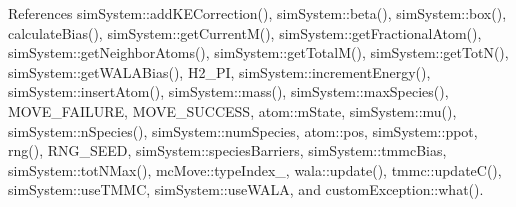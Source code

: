References sim\-System\-::add\-K\-E\-Correction(), sim\-System\-::beta(), sim\-System\-::box(), calculate\-Bias(), sim\-System\-::get\-Current\-M(), sim\-System\-::get\-Fractional\-Atom(), sim\-System\-::get\-Neighbor\-Atoms(), sim\-System\-::get\-Total\-M(), sim\-System\-::get\-Tot\-N(), sim\-System\-::get\-W\-A\-L\-A\-Bias(), H2\-\_\-P\-I, sim\-System\-::increment\-Energy(), sim\-System\-::insert\-Atom(), sim\-System\-::mass(), sim\-System\-::max\-Species(), M\-O\-V\-E\-\_\-\-F\-A\-I\-L\-U\-R\-E, M\-O\-V\-E\-\_\-\-S\-U\-C\-C\-E\-S\-S, atom\-::m\-State, sim\-System\-::mu(), sim\-System\-::n\-Species(), sim\-System\-::num\-Species, atom\-::pos, sim\-System\-::ppot, rng(), R\-N\-G\-\_\-\-S\-E\-E\-D, sim\-System\-::species\-Barriers, sim\-System\-::tmmc\-Bias, sim\-System\-::tot\-N\-Max(), mc\-Move\-::type\-Index\-\_\-, wala\-::update(), tmmc\-::update\-C(), sim\-System\-::use\-T\-M\-M\-C, sim\-System\-::use\-W\-A\-L\-A, and custom\-Exception\-::what().


